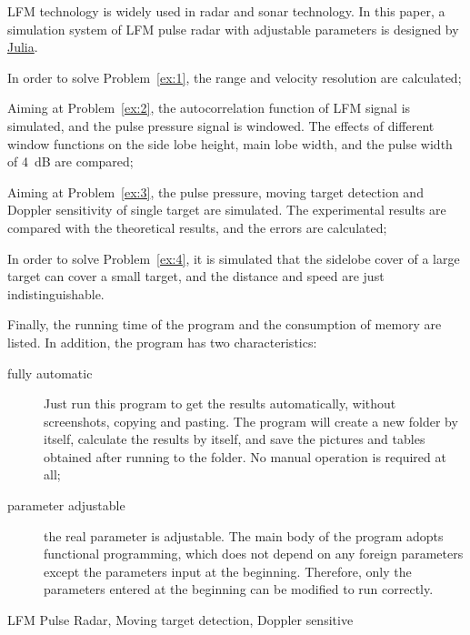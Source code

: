 \documentclass[../main]{subfiles}
\begin{document}
\begin{abstract*}
  LFM technology is widely used in radar and sonar technology. In this paper,
  a simulation system of LFM pulse radar with adjustable parameters is
  designed by \href{https://github.com/JuliaLang/julia}{Julia}.

  In order to solve Problem~\ref{ex:1}, the range and velocity resolution are calculated;

  Aiming at Problem~\ref{ex:2}, the autocorrelation function of LFM signal is
  simulated, and the pulse pressure signal is windowed. The effects of
  different window functions on the side lobe height, main lobe width, and
  the pulse width of \SI{4}{\dB} are compared;

  Aiming at Problem~\ref{ex:3}, the pulse pressure, moving target detection
  and Doppler sensitivity of single target are simulated. The experimental
  results are compared with the theoretical results, and the errors are
  calculated;

  In order to solve Problem~\ref{ex:4}, it is simulated that the sidelobe
  cover of a large target can cover a small target, and the distance and
  speed are just indistinguishable.

  Finally, the running time of the program and the consumption of memory are
  listed. In addition, the program has two characteristics:

  \begin{description}
    \item[fully automatic]Just run this program to get the results
      automatically, without screenshots, copying and pasting. The program
      will create a new folder by itself, calculate the results by itself,
      and save the pictures and tables obtained after running to the folder.
      No manual operation is required at all;
    \item[parameter adjustable] the real parameter is adjustable. The main
      body of the program adopts functional programming, which does not
      depend on any foreign parameters except the parameters input at the
      beginning. Therefore, only the parameters entered at the beginning can
      be modified to run correctly.
  \end{description} 
  \begin{keyword*}
    LFM Pulse Radar, Moving target detection, Doppler sensitive
  \end{keyword*}
\end{abstract*}
\end{document}
